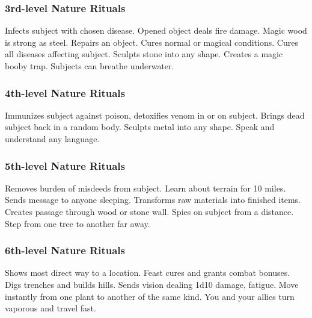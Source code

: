 \subsubsection{3rd-level Nature Rituals}
\begin{rituallist}
     Infects subject with chosen disease.
     Opened object deals fire damage.
     Magic wood is strong as steel.
     Repairs an object.
     Cures normal or magical conditions.
     Cures all diseases affecting subject.
     Sculpts stone into any shape.
     Creates a magic booby trap.
     Subjects can breathe underwater.
\end{rituallist}

\subsubsection{4th-level Nature Rituals}
\begin{rituallist}
     Immunizes subject against poison, detoxifies venom in or on subject.
     Brings dead subject back in a random body.
     Sculpts metal into any shape.
     Speak and understand any language.
\end{rituallist}

\subsubsection{5th-level Nature Rituals}
\begin{rituallist}
    \F\M Removes burden of misdeeds from subject.
     Learn about terrain for 10 miles.
     Sends message to anyone sleeping.
     Transforms raw materials into finished items.
     Creates passage through wood or stone wall.
    \F Spies on subject from a distance.
     Step from one tree to another far away.
\end{rituallist}

\subsubsection{6th-level Nature Rituals}
\begin{rituallist}
     Shows most direct way to a location.
     Feast cures and grants combat bonuses.
     Digs trenches and builds hills.
     Sends vision dealing 1d10 damage, fatigue.
     Move instantly from one plant to another of the same kind.
     You and your allies turn vaporous and travel fast.
\end{rituallist}

